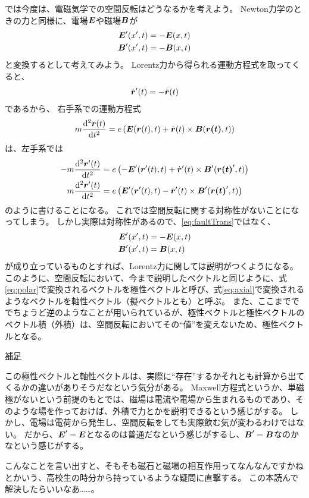 \documentclass[a4paper]{jsarticle}
\def\vec#1{\mbox{\boldmath $#1$}}
\newcommand{\dif}[2]{\frac{{\rm d} #1}{{\rm d} #2}}
\begin{document}
では今度は、電磁気学での空間反転はどうなるかを考えよう。
Newton力学のときの力と同様に、電場$\vec{E}$や磁場$\vec{B}$が
\begin{align}
	\begin{aligned}
		\vec{E}^{\prime}(x^{\prime}, t) &= -\vec{E}(x, t) \\
		\vec{B}^{\prime}(x^{\prime}, t) &= -\vec{B}(x, t) \\
	\end{aligned} \label{eq:faultTrans}
\end{align}
と変換するとして考えてみよう。
Lorentz力から得られる運動方程式を取ってくると、
\begin{align}
	\dot{\vec{r}}^{\prime}(t) = -\dot{\vec{r}}(t)
\end{align}
であるから、
右手系での運動方程式
\begin{align}
	m \dif{^2 \vec{r}(t)}{t^2} = e \left( \vec{E}(\vec{r}(t), t) + \dot{\vec{r}}(t) \times \vec{B}(\vec{r(t)}, t) \right)
\end{align}
は、左手系では
\begin{align}
	-m \dif{^2 \vec{r}^{\prime}(t)}{t^2} &= e \left( -\vec{E}^{\prime}(\vec{r}^{\prime}(t), t) + \dot{\vec{r}}^{\prime}(t) \times \vec{B}^{\prime}(\vec{r(t)}^{\prime}, t) \right) \\
	m \dif{^2 \vec{r}^{\prime}(t)}{t^2} &= e \left( \vec{E}^{\prime}(\vec{r}^{\prime}(t), t) - \dot{\vec{r}}^{\prime}(t) \times \vec{B}^{\prime}(\vec{r(t)}^{\prime}, t) \right)
\end{align}
のように書けることになる。
これでは空間反転に関する対称性がないことになってしまう。
しかし実際は対称性があるので、\eqref{eq:faultTrans}ではなく、
\begin{align}
	\vec{E}^{\prime}(x^{\prime}, t) &= -\vec{E}(x, t) \label{eq:polar} \\
	\vec{B}^{\prime}(x^{\prime}, t) &= \vec{B}(x, t) \label{eq:axial} \\
\end{align}
が成り立っているものとすれば、Lorentz力に関しては説明がつくようになる。
このように、空間反転において、今まで説明したベクトルと同じように、式\eqref{eq:polar}で変換されるベクトルを極性ベクトルと呼び、式\eqref{eq:axial}で変換されるようなベクトルを軸性ベクトル（擬ベクトルとも）と呼ぶ。
また、ここまでででちょうど逆のようなことが用いられているが、極性ベクトルと極性ベクトルのベクトル積（外積）は、空間反転においてその``値''を変えないため、極性ベクトルとなる。
\begin{screen}
	\underline{補足}

	この極性ベクトルと軸性ベクトルは、実際に``存在''するかそれとも計算から出てくるかの違いがありそうだなという気分がある。
	Maxwell方程式というか、単磁極がないという前提のもとでは、磁場は電流や電場から生まれるものであり、そのような場を作っておけば、外積で力とかを説明できるという感じがする。
	しかし、電場は電荷から発生し、空間反転をしても実際飲む気が変わるわけではない。
	だから、$\vec{E}^{\prime} = \vec{E}$となるのは普通だなという感じがするし、$\vec{B}^{\prime} = \vec{B}$なのかなという感じがする。

	こんなことを言い出すと、そもそも磁石と磁場の相互作用ってなんなんですかねとかいう、高校生の時分から持っているような疑問に直撃する。
	この本読んで解決したらいいなあ……。
\end{screen}
\end{document}

